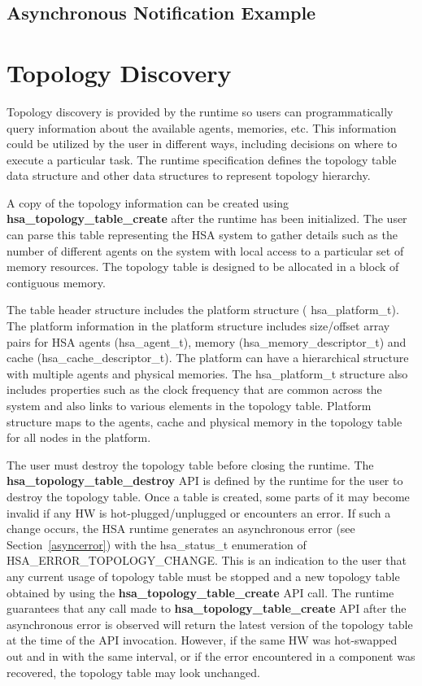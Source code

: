 \documentclass[final]{book}
\newcommand{\mariotodo}[1]{\todo[color=CarnationPink]{#1}}
\newcommand{\reffun}[1]{\textbf{#1}}
\newcommand{\reftyp}[1]{#1}
\newcommand{\refenu}[1]{\reftyp{#1}}
\begin{document}
\subsection{Asynchronous Notification Example}


\hypertarget{component}{}\section{Topology Discovery}
\label{topology}

Topology discovery is provided by the runtime so users can programmatically
query information about the available agents, memories, etc. This information
could be utilized by the user in different ways, including decisions on where to
execute a particular task. The runtime specification defines the topology table
data structure and other data structures to represent topology hierarchy.

A copy of the topology information can be created using
\reffun{hsa_topology_table_create} after the runtime has been
initialized. The user can parse this table representing the HSA system to gather
details such as the number of different agents on the system with local access
to a particular set of memory resources. The topology table is designed to be
allocated in a block of contiguous memory.

The table header structure includes the platform structure (
\reftyp{hsa_platform_t}). The platform information in the platform structure
includes size/offset array pairs for HSA agents (\reftyp{hsa_agent_t}), memory
(\reftyp{hsa_memory_descriptor_t}) and cache
(\reftyp{hsa_cache_descriptor_t}). The platform can have a hierarchical
structure with multiple agents and physical memories. The
\reftyp{hsa_platform_t} structure also includes properties such as the clock
frequency that are common across the system and also links to various elements
in the topology table. Platform structure maps to
the agents, cache and physical memory in the topology table for all nodes in the
platform.

The user must destroy the topology table before closing the runtime. The
\reffun{hsa_topology_table_destroy} API is defined by the runtime for the
user to destroy the topology table. Once a table is created, some parts of it
may become invalid if any HW is hot-plugged/unplugged or encounters an error. If
such a change occurs, the HSA runtime generates an asynchronous error (see
Section~\ref{asyncerror}) with the \reftyp{hsa_status_t} enumeration of
\refenu{HSA_ERROR_TOPOLOGY_CHANGE}\mariotodo{never defined}. This is an
indication to the user that any current usage of topology table must be stopped
and a new topology table obtained by using the
\reffun{hsa_topology_table_create} API call. The runtime guarantees that any
call made to \reffun{hsa_topology_table_create} API after the asynchronous
error is observed will return the latest version of the topology table at the
time of the API invocation. However, if the same HW was hot-swapped out and in
with the same interval, or if the error encountered in a component was
recovered, the topology table may look unchanged.
\end{document}
